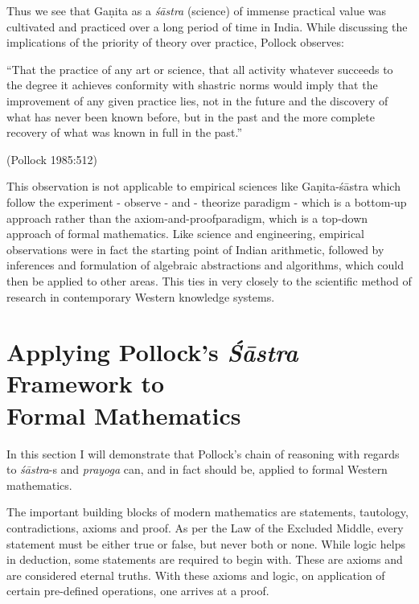 Thus we see that Gaṇita as a {\sl śāstra} (science) of immense practical value was cultivated and practiced over a long period of time in India. While discussing the implications of the priority of theory over practice, Pollock observes: 
\begin{myquote}
``That the practice of any art or science, that all activity whatever succeeds to the degree it achieves conformity with shastric norms would imply that the improvement of any given practice lies, not in the future and the discovery of what has never been known before, but in the past and the more complete recovery of what was known in full in the past.''

\hfill (Pollock 1985:512)
\end{myquote}

This observation is not applicable to empirical sciences like Gaṇita-śāstra which follow the experiment - observe - and - theorize paradigm - which is a bottom-up approach rather than the axiom-and-proof\break paradigm, which is a top-down approach of formal mathematics. Like science and engineering, empirical observations were in fact the starting point of Indian arithmetic, followed by inferences and formulation of algebraic abstractions and algorithms, which could then be applied to other areas. This ties in very closely to the scientific method of research in contemporary Western knowledge systems.\\[-20pt]

\section*{Applying Pollock’s {\sl\bfseries Śāstra} Framework to\\ Formal Mathematics}

In this section I will demonstrate that Pollock’s chain of reasoning with regards to {\sl śāstra}-s and {\sl prayoga} can, and in fact should be, applied to formal Western mathematics.

The important building blocks of modern mathematics are statements, tautology, contradictions, axioms and proof. As per the Law of the Excluded Middle, every statement must be either true or false, but never both or none.  While logic helps in deduction, some statements are required to begin with. These are axioms and are considered eternal truths. With these axioms and logic, on application of certain pre-defined operations, one arrives at a proof. 

